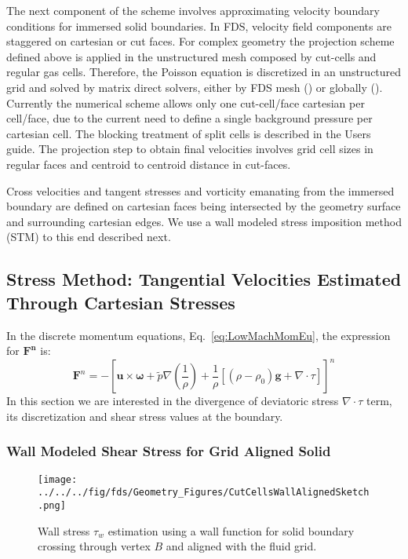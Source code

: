 The next component of the scheme involves approximating velocity boundary conditions for immersed solid boundaries. In FDS, velocity field components are staggered on cartesian or cut faces. 
For complex geometry the projection scheme defined above is applied in the unstructured mesh composed by cut-cells and regular gas cells. Therefore, the Poisson equation is discretized in an unstructured grid and solved by matrix direct solvers, either by FDS mesh () or globally (). Currently the numerical scheme allows only one cut-cell/face cartesian per cell/face, due to the current need to define a single background pressure per cartesian cell. The blocking treatment of split cells is described in the Users guide. The projection step to obtain final velocities involves grid cell sizes in regular faces and centroid to centroid distance in cut-faces.

Cross velocities and tangent stresses and vorticity emanating from the immersed boundary are defined on cartesian faces being intersected by the geometry surface and surrounding cartesian edges. We use a wall modeled stress imposition method (STM) to this end described next.
 
\subsection{Stress Method: Tangential Velocities Estimated Through Cartesian Stresses}

In the discrete momentum equations, Eq.~\eqref{eq:LowMachMomEu}, the expression for $\mathbf{F^n}$ is:
%
\begin{equation}
   \mathbf{F}^n = -\left[ \mathbf{u} \times \boldsymbol{\omega} + \tilde{p} \nabla \left( \frac{1}{\rho} \right) 
   + \frac{1}{\rho} \left[ (\rho-\rho_0) \mathbf{g} + \nabla \cdot \tau \right]  \right]^n \label{eqn:momfn}
\end{equation} 
%
In this section we are interested in the divergence of deviatoric stress $ \nabla \cdot \tau$ term, its discretization and shear stress values at the boundary.

\subsubsection{Wall Modeled Shear Stress for Grid Aligned Solid}

\begin{figure}[h]
      \centering
       \texttt{[image: ../../../fig/fds/Geometry\_Figures/CutCellsWallAlignedSketch.png]}
      \caption[Wall stress estimation]{Wall stress $\tau_w$ estimation using a wall function for solid boundary crossing through vertex $B$ and aligned with the fluid grid.}
        \label{Fig:Strss}
\end{figure}
%

